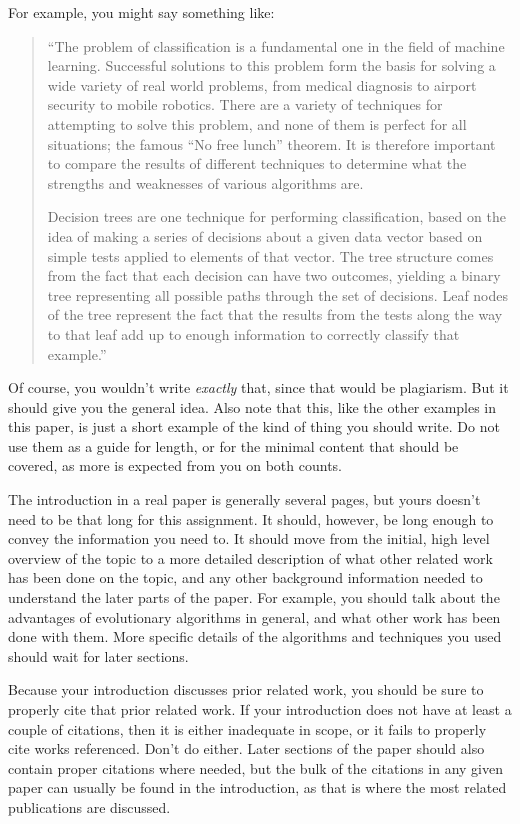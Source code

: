 \documentclass[12pt, letterpaper]{article}
\begin{document}
For example, you might say something like: 
\begin{quote}
``The problem of classification is a fundamental one in the field of machine
learning.  Successful solutions to this problem form the basis for solving a wide
variety of real world problems, from medical diagnosis to airport security to
mobile robotics.  There are a variety of techniques for attempting to solve this
problem, and none of them is perfect for all situations; the famous ``No free
lunch'' theorem\cite{noFreeLunch}.  It is therefore important to compare the
results of different techniques to determine what the strengths and weaknesses
of various algorithms are. 

Decision trees are one technique for performing classification, based on the
idea of making a series of decisions about a given data vector based on simple
tests applied to elements of that vector.  The tree structure comes from the
fact that each decision can have two outcomes, yielding a binary tree
representing all possible paths through the set of decisions.  Leaf nodes of the
tree represent the fact that the results from the tests along the way to that
leaf add up to enough information to correctly classify that example.''
\end{quote}

Of course, you wouldn't write \emph{exactly} that, since that would be
plagiarism.  But it should give you the general idea.  Also note that this, like
the other examples in this paper, is just a short example of the kind of thing
you should write.  Do not use them as a guide for length, or for the minimal
content that should be covered, as more is expected from you on both counts.

The introduction in a real paper is generally several pages, but yours doesn't
need to be that long for this assignment.  It should, however, be long enough to
convey the information you need to.  It should move from the initial, high level
overview of the topic to a more detailed description of what other related work
has been done on the topic, and any other background information needed to
understand the later parts of the paper.  For example, you should talk about the
advantages of evolutionary algorithms in general, and what other work has been
done with them.  More specific details of the algorithms and techniques you used
should wait for later sections.

Because your introduction discusses prior related work, you should be sure to
properly cite that prior related work.  If your introduction does not have at
least a couple of citations, then it is either inadequate in scope, or it fails
to properly cite works referenced.  Don't do either.  Later sections of the
paper should also contain proper citations where needed, but the bulk of the
citations in any given paper can usually be found in the introduction, as that
is where the most related publications are discussed.
\end{document}
